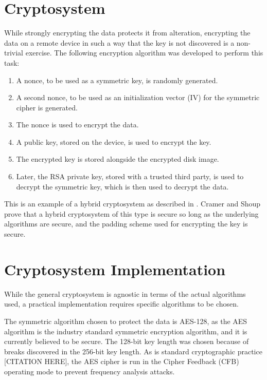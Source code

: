 \section{Cryptosystem}

While strongly encrypting the data protects it from alteration, encrypting the data on a remote device in such
a way that the key is not discovered is a non-trivial exercise. The following encryption algorithm was developed
to perform this task:

\begin{enumerate}
  \item A nonce, to be used as a symmetric key, is randomly generated.
  \item A second nonce, to be used as an initialization vector (IV) for the symmetric cipher is generated.
  \item The nonce is used to encrypt the data.
  \item A public key, stored on the device, is used to encrypt the key.
  \item The encrypted key is stored alongside the encrypted disk image.
  \item Later, the RSA private key, stored with a trusted third party, is
        used to decrypt the symmetric key, which is then used to decrypt
        the data.
\end{enumerate}

This is an example of a hybrid cryptosystem as described in \cite{cramer2004}. Cramer and Shoup prove that a hybrid cryptosystem of
this type is secure so long as the underlying algorithms are secure, and the padding scheme used for encrypting the key is secure.

\section{Cryptosystem Implementation}

While the general cryptosystem is agnostic in terms of the actual algorithms used, a practical implementation requires specific
algorithms to be chosen.

The symmetric algorithm chosen to protect the data is AES-128, as the AES algorithm is the industry standard symmetric encryption
algorithm, and it is currently believed to be secure. The 128-bit key length was chosen because of breaks discovered in the 256-bit
key length\cite{Biryukov2009}. As is standard cryptographic practice [CITATION HERE], the AES cipher is run in the Cipher Feedback (CFB)
operating mode to prevent frequency analysis attacks.

